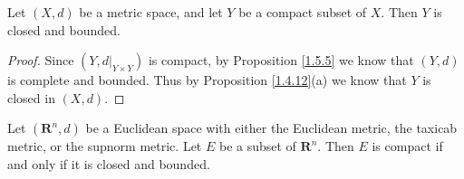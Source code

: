 \begin{corollary}\label{1.5.6}
    Let \((X, d)\) be a metric space, and let \(Y\) be a compact subset of \(X\).
    Then \(Y\) is closed and bounded.
\end{corollary}

\begin{proof}
    Since \((Y, d|_{Y \times Y})\) is compact, by Proposition \ref{1.5.5} we know that \((Y, d)\) is complete and bounded.
    Thus by Proposition \ref{1.4.12}(a) we know that \(Y\) is closed in \((X, d)\).
\end{proof}

\begin{theorem}\label{1.5.7}
    Let \((\mathbf{R}^n, d)\) be a Euclidean space with either the Euclidean metric, the taxicab metric, or the supnorm metric.
    Let \(E\) be a subset of \(\mathbf{R}^n\).
    Then \(E\) is compact if and only if it is closed and bounded.
\end{theorem}


